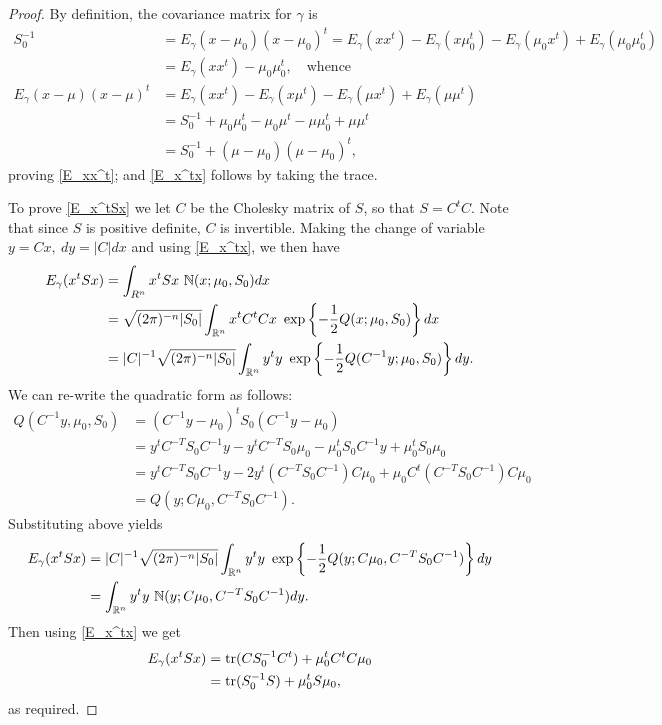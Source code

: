\documentclass[12pt,leqno]{article}
\begin{document}
  \begin{proof}
    By definition, the covariance matrix for $\gamma$ is
    \begin{align*}
    S_0^{-1} &= E_{\gamma}(x-\mu_0)(x-\mu_0)^t = E_{\gamma}(xx^t) - E_{\gamma}(x\mu_0^t) - E_{\gamma}(\mu_0{x}^t) + E_{\gamma}(\mu_0\mu_0^t)\\
    &= E_{\gamma}(xx^t) - \mu_0\mu_0^t, \quad\text{whence}\\
    E_{\gamma}(x-\mu)(x-\mu)^t &= E_{\gamma}(xx^t) - E_{\gamma}(x\mu^t) - E_{\gamma}(\mu{x}^t) + E_{\gamma}(\mu\mu^t) \\
    &= S_0^{-1} + \mu_0\mu_0^t - \mu_0\mu^t-\mu\mu_0^t + \mu\mu^t\\
    &= S_0^{-1} + (\mu-\mu_0)(\mu-\mu_0)^t,
    \end{align*}
    proving \eqref{E_xx^t}; and \eqref{E_x^tx} follows by taking the trace.

    To prove \eqref{E_x^tSx} we let $C$ be the Cholesky matrix of $S$, so that
    $S = C^tC$.  Note that since $S$ is positive definite, $C$ is invertible.
    Making the change of variable $y = Cx,~ dy = |C|dx$ and using \eqref{E_x^tx}, we then have
      \begin{align*}
        E_{\gamma}(x^tSx) &= \int_{R^n}x^tSx~{\mathbb N}(x;\mu_0,S_0)dx\\
        &= \sqrt{(2\pi)^{-n}|S_0|}\int_{{\mathbb R}^n}x^tC^tCx~\exp\left\{-\frac{1}{2}Q(x;\mu_0,S_0)\right\}dx \\
        &= |C|^{-1}\sqrt{(2\pi)^{-n}|S_0|}\int_{{\mathbb R}^n}y^ty~\exp\left\{-\frac{1}{2}Q(C^{-1}y;\mu_0,S_0)\right\}dy.
      \end{align*}
      We can re-write the quadratic form as follows:
      \begin{align*}
        Q(C^{-1}y,\mu_0,S_0) &= (C^{-1}y-\mu_0)^tS_0(C^{-1}y-\mu_0)\\
        &= y^tC^{-T}S_0C^{-1}y - y^tC^{-T}S_0\mu_0 - \mu_0^tS_0C^{-1}y + \mu_0^tS_0\mu_0 \\
        &= y^tC^{-T}S_0C^{-1}y - 2y^t(C^{-T}S_0C^{-1})C\mu_0 + \mu_0C^t(C^{-T}S_0C^{-1})C\mu_0\\
        &= Q(y;C\mu_0,C^{-T}S_0C^{-1}).
      \end{align*}
      Substituting above yields
      \begin{align*}
        E_{\gamma}(x^tSx) &=  |C|^{-1}\sqrt{(2\pi)^{-n}|S_0|}\int_{{\mathbb R}^n}y^ty~\exp\left\{-\frac{1}{2}Q(y;C\mu_0,C^{-T}S_0C^{-1})\right\}dy \\
        &= \int_{{\mathbb R}^n}y^ty~{\mathbb N}(y;C\mu_0,C^{-T}S_0C^{-1})dy.
      \end{align*}
      Then using \eqref{E_x^tx} we get
      \begin{align*}
        E_{\gamma}(x^tSx) &=  \text{\rm tr}(CS_0^{-1}C^t) + \mu_0^tC^tC\mu_0 \\
        &= \text{\rm tr}(S_0^{-1}S) + \mu_0^tS\mu_0,
      \end{align*}
      as required.


\end{proof}
\end{document}
